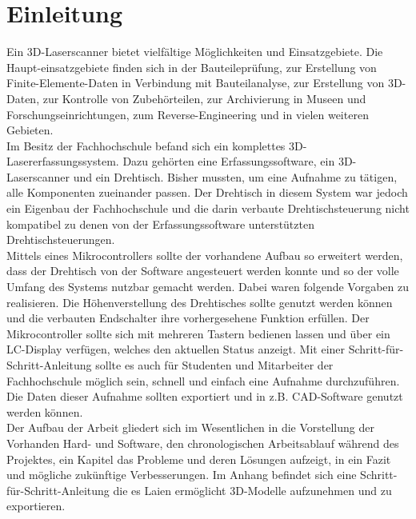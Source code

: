 \chapter{Einleitung}
\label{cha:Einleitung}
Ein 3D-Laserscanner bietet vielfältige Möglichkeiten und Einsatzgebiete. Die Haupt-einsatzgebiete finden sich in der Bauteileprüfung, zur Erstellung von Finite-Elemente-Daten in Verbindung mit Bauteilanalyse, zur Erstellung von 3D-Daten, zur Kontrolle von Zubehörteilen, zur Archivierung in Museen und Forschungseinrichtungen, zum Reverse-Engineering und in vielen weiteren Gebieten.\\
Im Besitz der Fachhochschule befand sich ein komplettes 3D-Lasererfassungssystem. Dazu gehörten eine Erfassungssoftware, ein 3D-Laserscanner und ein Drehtisch. Bisher mussten, um eine Aufnahme zu tätigen, alle Komponenten zueinander passen. Der Drehtisch in diesem System war jedoch ein Eigenbau der Fachhochschule und die darin verbaute Drehtischsteuerung nicht kompatibel zu denen von der Erfassungssoftware unterstützten Drehtischsteuerungen.\\
Mittels eines Mikrocontrollers sollte der vorhandene Aufbau so erweitert werden, dass der Drehtisch von der Software angesteuert werden konnte und so der volle Umfang des Systems nutzbar gemacht werden. Dabei waren folgende Vorgaben zu realisieren. Die Höhenverstellung des Drehtisches sollte genutzt werden können und die verbauten Endschalter ihre vorhergesehene Funktion erfüllen. 
Der Mikrocontroller sollte sich mit mehreren Tastern bedienen lassen und über ein LC-Display verfügen, welches den aktuellen Status anzeigt. Mit einer Schritt-für-Schritt-Anleitung sollte es auch für Studenten und Mitarbeiter der Fachhochschule möglich sein, schnell und einfach eine Aufnahme durchzuführen. Die Daten dieser Aufnahme sollten exportiert und in z.B. CAD-Software genutzt werden können. \\
Der Aufbau der Arbeit gliedert sich im Wesentlichen in die Vorstellung der Vorhanden Hard- und Software, den chronologischen Arbeitsablauf während des Projektes, ein Kapitel das Probleme und deren Lösungen aufzeigt, in ein Fazit und mögliche zukünftige Verbesserungen. Im Anhang befindet sich eine Schritt-für-Schritt-Anleitung die es Laien ermöglicht 3D-Modelle aufzunehmen und zu exportieren.
